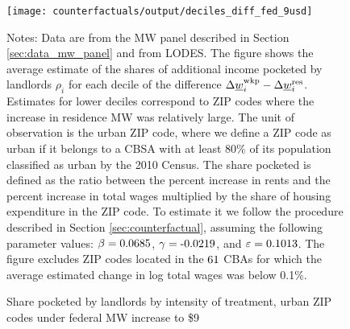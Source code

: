 \begin{figure}[h!]
    \centering
    \caption{Share pocketed by landlords by intensity of treatment, 
             urban ZIP codes under federal MW increase to \$9}
    \label{fig:rho_by_decile_MW_gap}

	\texttt{[image: counterfactuals/output/deciles\_diff\_fed\_9usd]}

    \begin{minipage}{.95\textwidth} \footnotesize
        \vspace{3mm}
        Notes:
        Data are from the MW panel described in Section \ref{sec:data_mw_panel} 
        and from LODES.
        The figure shows the average estimate of the shares of additional
        income pocketed by landlords $\rho_i$ for each decile of the 
        difference $\Delta \underline{w}_i^{\text{wkp}} - \Delta \underline{w}_i^{\text{res}}$.
        Estimates for lower deciles correspond to ZIP codes where the increase 
        in residence MW was relatively large.
        The unit of observation is the urban ZIP code, where we define a ZIP code 
        as urban if it belongs to a CBSA with at least 80\% of its population 
        classified as urban by the 2010 Census.
        The share pocketed is defined as the ratio between the percent increase 
        in rents and the percent increase in total wages multiplied by the share 
        of housing expenditure in the ZIP code.
        To estimate it we follow the procedure described in Section 
        \ref{sec:counterfactual}, assuming the following parameter values: 
        $\beta = \textnormal{0.0685}$, $\gamma = \textnormal{-0.0219}$, and $\varepsilon = \textnormal{0.1013}$.
        The figure excludes ZIP codes located in the $\textnormal{61}$ CBAs for which the average
        estimated change in log total wages was below 0.1\%.
    \end{minipage}
\end{figure}

